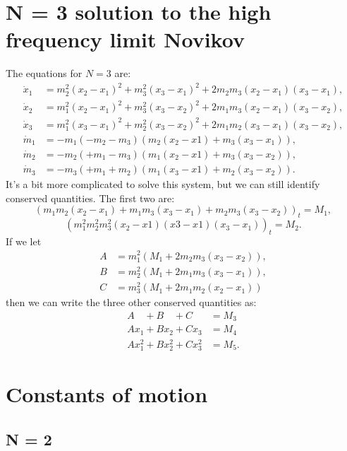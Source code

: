 \documentclass[english,master]{liumaiex}
\theoremstyle{plain}
\theoremstyle{definition}
\begin{document}
\section{N = 3 solution to the high frequency limit Novikov}
The equations for $N = 3$ are:
\begin{align}
	\dot{x}_1 & = m_2^2 (x_2 - x_1)^2 + m_3^2 (x_3 - x_1)^2 + 2m_2m_3(x_2 - x_1)(x_3 - x_1), \\
	\dot{x}_2 & = m_1^2 (x_2 - x_1)^2 + m_3^2 (x_3 - x_2)^2 + 2m_1m_3(x_2 - x_1)(x_3 - x_2), \\
	\dot{x}_3 & = m_1^2 (x_3 - x_1)^2 + m_2^2 (x_3 - x_2)^2 + 2m_1m_2(x_3 - x_1)(x_3 - x_2), \\
	\dot{m}_1 & = -m_1 (-m_2-m_3)(m_2 (x_2 - x1) + m_3 (x_3 - x_1)),  \\
	\dot{m}_2 & = -m_2 (+m_1-m_3)(m_1 (x_2 - x1) + m_3 (x_3 - x_2)),  \\
	\dot{m}_3 & = -m_3 (+m_1+m_2)(m_1 (x_3 - x1) + m_2 (x_3 - x_2)).
\end{align}
It's a bit more complicated to solve this system, but we can still identify conserved quantities. The first two are:
\begin{equation}
	(m_1m_2(x_2 - x_1) + m_1m_3(x_3 - x_1) + m_2m_3(x_3 - x_2))_t = M_1,
\end{equation}
\begin{equation}
	(m_1^2m_2^2m_3^2(x_2 - x1)(x3 - x1)(x_3 - x_1))_t = M_2.
\end{equation}
If we let
\begin{align}
	A & = m_1^2(M_1 + 2m_2m_3(x_3-x_2)), \\
	B & = m_2^2(M_1 + 2m_1m_3(x_3-x_1)), \\
	C & = m_3^2(M_1 + 2m_1m_2(x_2-x_1))
\end{align}
then we can write the three other conserved quantities as:
\begin{align}
	A\phantom{x_1} + B\phantom{x_2} + C\phantom{x_3} &= M_3 \\
	Ax_1 + Bx_2 + Cx_3 &= M_4 \\
	Ax_1^2 + Bx_2^2 + Cx_3^2 &= M_5.
\end{align}

\section{Constants of motion}

\subsection{N = 2}
\end{document}
